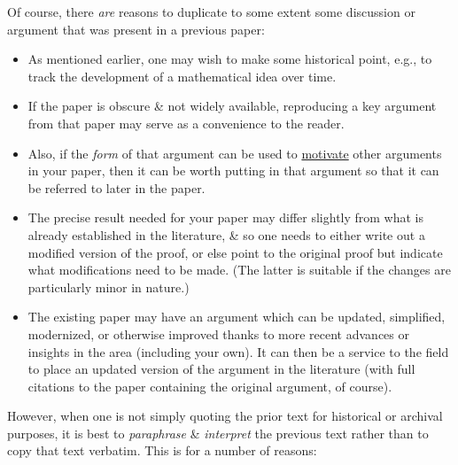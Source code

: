 \documentclass[oneside]{book}
\numberwithin{equation}{section}
\begin{document}
Of course, there \textit{are} reasons to duplicate to some extent some discussion or argument that was present in a previous paper:
\begin{itemize}
	\item As mentioned earlier, one may wish to make some historical point, e.g., to track the development of a mathematical idea over time.
	\item If the paper is obscure \& not widely available, reproducing a key argument from that paper may serve as a convenience to the reader.
	\item Also, if the \textit{form} of that argument can be used to \href{https://terrytao.wordpress.com/advice-on-writing-papers/motivate-the-paper/}{motivate} other arguments in your paper, then it can be worth putting in that argument so that it can be referred to later in the paper.
	\item The precise result needed for your paper may differ slightly from what is already established in the literature, \& so one needs to either write out a modified version of the proof, or else point to the original proof but indicate what modifications need to be made. (The latter is suitable if the changes are particularly minor in nature.)
	\item The existing paper may have an argument which can be updated, simplified, modernized, or otherwise improved thanks to more recent advances or insights in the area (including your own). It can then be a service to the field to place an updated version of the argument in the literature (with full citations to the paper containing the original argument, of course).
\end{itemize}
However, when one is not simply quoting the prior text for historical or archival purposes, it is best to \textit{paraphrase} \& \textit{interpret} the previous text rather than to copy that text verbatim. This is for a number of reasons:
\end{document}
